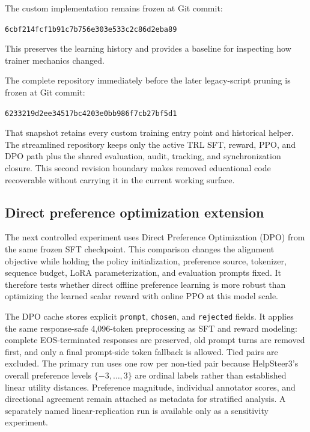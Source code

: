 \documentclass[11pt]{article}
\begin{document}
The custom implementation remains frozen at Git commit:
\begin{center}
{\small\texttt{6cbf214fcf1b91c7b756e303e533c2c86d2eba89}}
\end{center}
This preserves the learning history and provides a baseline for inspecting how
trainer mechanics changed.

The complete repository immediately before the later legacy-script pruning is
frozen at Git commit:
\begin{center}
{\small\texttt{6233219d2ee34517bc4203e0bb986f7cb27bf5d1}}
\end{center}
That snapshot retains every custom training entry point and historical helper.
The streamlined repository keeps only the active TRL SFT, reward, PPO, and DPO
path plus the shared evaluation, audit, tracking, and synchronization closure.
This second revision boundary makes removed educational code recoverable
without carrying it in the current working surface.

\subsection{Direct preference optimization extension}

The next controlled experiment uses Direct Preference Optimization (DPO)
\cite{rafailov2023} from the same frozen SFT checkpoint. This comparison
changes the alignment objective while holding the policy initialization,
preference source, tokenizer, sequence budget, LoRA parameterization, and
evaluation prompts fixed. It therefore tests whether direct offline preference
learning is more robust than optimizing the learned scalar reward with online
PPO at this model scale.

The DPO cache stores explicit \texttt{prompt}, \texttt{chosen}, and
\texttt{rejected} fields. It applies the same response-safe 4,096-token
preprocessing as SFT and reward modeling: complete EOS-terminated responses
are preserved, old prompt turns are removed first, and only a final prompt-side
token fallback is allowed. Tied pairs are excluded. The primary run uses one
row per non-tied pair because HelpSteer3's overall preference levels
$\{-3,\ldots,3\}$ are ordinal labels rather than established linear utility
distances. Preference magnitude, individual annotator scores, and directional
agreement remain attached as metadata for stratified analysis. A separately
named linear-replication run is available only as a sensitivity experiment.
\end{document}
